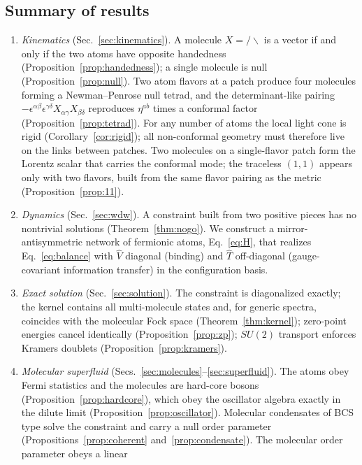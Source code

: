 \documentclass[reprint,aps,prd,amsmath,amssymb,superscriptaddress,nofootinbib,floatfix]{revtex4-2}
\theoremstyle{plain}
\theoremstyle{definition}
\theoremstyle{remark}
\newcommand{\Lat}{\ensuremath{/}}                 %
\newcommand{\Rat}{\ensuremath{\backslash}}        %
\newcommand{\Mol}{\ensuremath{X}}                 %
\newcommand{\Tc}{\hat{T}}
\newcommand{\Vc}{\hat{V}}
\newcommand{\SU}{SU(2)}
\begin{document}
\subsection{Summary of results}

\begin{enumerate}
\item \emph{Kinematics} (Sec.~\ref{sec:kinematics}). A molecule $\Mol=\Lat\Rat$ is a vector if and only if
the two atoms have opposite handedness (Proposition~\ref{prop:handedness}); a single molecule is null
(Proposition~\ref{prop:null}). Two atom flavors at a patch produce four molecules forming a
Newman--Penrose null tetrad, and the determinant-like pairing $-\epsilon^{\alpha\beta}\epsilon^{\gamma\delta}
\Mol_{\alpha\gamma}\Mol_{\beta\delta}$ reproduces $\eta^{ab}$ times a conformal factor
(Proposition~\ref{prop:tetrad}). For any number of atoms the local light cone is rigid
(Corollary~\ref{cor:rigid}); all non-conformal geometry must therefore live on the links between patches.
Two molecules on a single-flavor patch form the Lorentz scalar that carries the conformal mode; the traceless
$(1,1)$ appears only with two flavors, built from the same flavor pairing as the metric (Proposition~\ref{prop:11}).
\item \emph{Dynamics} (Sec.~\ref{sec:wdw}). A constraint built from two positive pieces has no nontrivial
solutions (Theorem~\ref{thm:nogo}). We construct a mirror-antisymmetric network of fermionic atoms,
Eq.~\eqref{eq:H}, that realizes Eq.~\eqref{eq:balance} with $\Vc$ diagonal (binding) and $\Tc$ off-diagonal
(gauge-covariant information transfer) in the configuration basis.
\item \emph{Exact solution} (Sec.~\ref{sec:solution}). The constraint is diagonalized exactly; the kernel
contains all multi-molecule states and, for generic spectra, coincides with the molecular Fock space
(Theorem~\ref{thm:kernel}); zero-point energies cancel identically (Proposition~\ref{prop:zp}); $\SU$
transport enforces Kramers doublets (Proposition~\ref{prop:kramers}).
\item \emph{Molecular superfluid} (Secs.~\ref{sec:molecules}--\ref{sec:superfluid}). The atoms obey Fermi statistics and the
molecules are hard-core bosons (Proposition~\ref{prop:hardcore}), which obey the oscillator algebra exactly in the dilute
limit (Proposition~\ref{prop:oscillator}). Molecular condensates of BCS type solve the constraint and carry a null
order parameter (Propositions~\ref{prop:coherent} and~\ref{prop:condensate}). The molecular order parameter obeys a linear

\end{enumerate}
\end{document}

